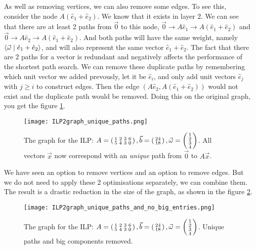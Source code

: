 As well as removing vertices, we can also remove some edges. To see this, consider the node $A(\hat e_1 + \hat e_2)$. We know that it exists in layer 2. We can see that there are at least 2 paths from $\vec 0$ to this node, $\vec 0 \rightarrow A\hat e_1 \rightarrow A(\hat e_1 + \hat e_2)$ and $\vec 0 \rightarrow A\hat e_2 \rightarrow A(\hat e_1 + \hat e_2)$. And both paths will have the same weight, namely $\langle \vec \omega \mid \hat e_1 + \hat e_2 \rangle$, and will also represent the same vector $\hat e_1 + \hat e_2$. The fact that there are 2 paths for a vector is redundant and negatively affects the performance of the shortest path search. We can remove these duplicate paths by remembering which unit vector we added prevously, let it be $\hat e_i$, and only add unit vectors $\hat e_j$ with $j \geq i$ to construct edges. Then the edge $(A\hat e_2, A(\hat e_1 + \hat e_2))$ would not exist and the duplicate path would be removed. Doing this on the original graph, you get the figure \ref{fig:ILP2graph_unique_paths}.

\begin{figure}
    \texttt{[image: ILP2graph\_unique\_paths.png]}
    \caption{\label{fig:ILP2graph_unique_paths}The graph for the ILP: $A = \left(\begin{smallmatrix}1&2&3&6\\5&4&3&0\end{smallmatrix}\right), \vec b = \left(\begin{smallmatrix}24\\18\end{smallmatrix}\right), \vec \omega = \left(\begin{smallmatrix}1\\2\\3\\4\end{smallmatrix}\right)$. All vectors $\vec x$ now correspond with an \textit{unique} path from $\vec 0$ to $A\vec x$.}
\end{figure}

We have seen an option to remove vertices and an option to remove edges. But we do not need to apply these 2 optimisations separately, we can combine them. The result is a drastic reduction in the size of the graph, as shown in the figure \ref{fig:ILP2graph_unique_paths_and_no_big_entries}.

\begin{figure}
    \texttt{[image: ILP2graph\_unique\_paths\_and\_no\_big\_entries.png]}
    \caption{\label{fig:ILP2graph_unique_paths_and_no_big_entries}The graph for the ILP: $A = \left(\begin{smallmatrix}1&2&3&6\\5&4&3&0\end{smallmatrix}\right), \vec b = \left(\begin{smallmatrix}24\\18\end{smallmatrix}\right), \vec \omega = \left(\begin{smallmatrix}1\\2\\3\\4\end{smallmatrix}\right)$. Unique paths and big components removed.}
\end{figure}

